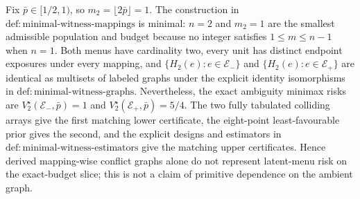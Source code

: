 Fix \(\bar p\in[1/2,1)\), so \(m_2=\lfloor2\bar p\rfloor=1\). The construction in \(\mathrm{def{:}minimal\text{-}witness\text{-}mappings}\) is minimal: \(n=2\) and \(m_2=1\) are the smallest admissible population and budget because no integer satisfies \(1\le m\le n-1\) when \(n=1\). Both menus have cardinality two, every unit has distinct endpoint exposures under every mapping, and \(\{H_2(e):e\in\mathcal E_-\}\) and \(\{H_2(e):e\in\mathcal E_+\}\) are identical as multisets of labeled graphs under the explicit identity isomorphisms in \(\mathrm{def{:}minimal\text{-}witness\text{-}graphs}\). Nevertheless, the exact ambiguity minimax risks are \(V_2^\star(\mathcal E_-,\bar p)=1\) and \(V_2^\star(\mathcal E_+,\bar p)=5/4\). The two fully tabulated colliding arrays give the first matching lower certificate, the eight-point least-favourable prior gives the second, and the explicit designs and estimators in \(\mathrm{def{:}minimal\text{-}witness\text{-}estimators}\) give the matching upper certificates. Hence derived mapping-wise conflict graphs alone do not represent latent-menu risk on the exact-budget slice; this is not a claim of primitive dependence on the ambient graph.
